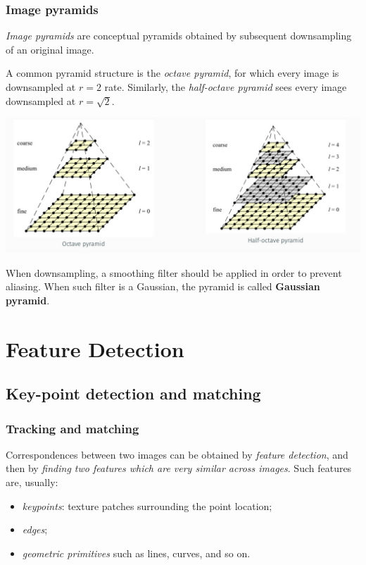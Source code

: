 \documentclass[10pt]{report}
\begin{document}
\subsection{Image pyramids}
\label{image-pyramids}
\emph{Image pyramids} are conceptual pyramids obtained by subsequent
downsampling of an original image.

A common pyramid structure is the \emph{octave pyramid}, for which every
image is downsampled at \(r = 2\) rate. Similarly, the \emph{half-octave
pyramid} sees every image downsampled at \(r = \sqrt{2}\).

\begin{center}
\includegraphics[width=.9\linewidth]{./pics/proc/image-pyramid.jpg}
\end{center}

When downsampling, a smoothing filter should be applied in order to
prevent aliasing. When such filter is a Gaussian, the pyramid is called
\textbf{Gaussian pyramid}.

\chapter{Feature Detection}
\label{feature-detection}
\section{Key-point detection and matching}
\label{key-point-detection-and-matching}
\subsection{Tracking and matching}
\label{tracking-and-matching}
Correspondences between two images can be obtained by \emph{feature
detection}, and then by \emph{finding two features which are very similar
across images}. Such features are, usually:

\begin{itemize}
\item \emph{keypoints}: texture patches surrounding the point location;
\item \emph{edges};
\item \emph{geometric primitives} such as lines, curves, and so on.
\end{itemize}
\end{document}
